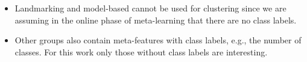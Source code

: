 \begin{itemize}
    \item Landmarking and model-based cannot be used for clustering since we are assuming in the online phase of meta-learning that there are no class labels. 
    \item Other groups also contain meta-features with class labels, e.g., the number of classes. For this work only those without class labels are interesting.
\end{itemize}